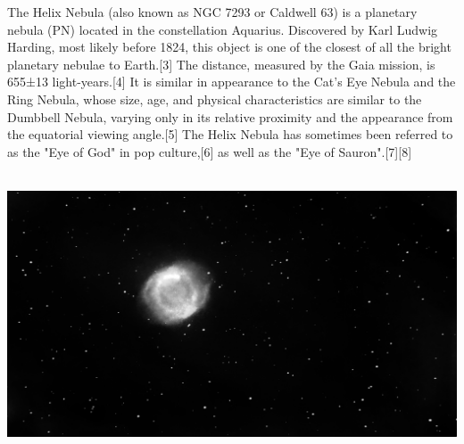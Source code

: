 {\footnotesize\color{white}
The Helix Nebula (also known as NGC 7293 or Caldwell 63) is a planetary nebula (PN) located in the constellation Aquarius. Discovered by Karl Ludwig Harding, most likely before 1824, this object is one of the closest of all the bright planetary nebulae to Earth.[3] The distance, measured by the Gaia mission, is 655±13 light-years.[4] It is similar in appearance to the Cat's Eye Nebula and the Ring Nebula, whose size, age, and physical characteristics are similar to the Dumbbell Nebula, varying only in its relative proximity and the appearance from the equatorial viewing angle.[5] The Helix Nebula has sometimes been referred to as the "Eye of God" in pop culture,[6] as well as the "Eye of Sauron".[7][8]


}\ \\
\includegraphics[width=\textwidth]{../Imaging//Grayscale/Helix_Nebula.jpg}
